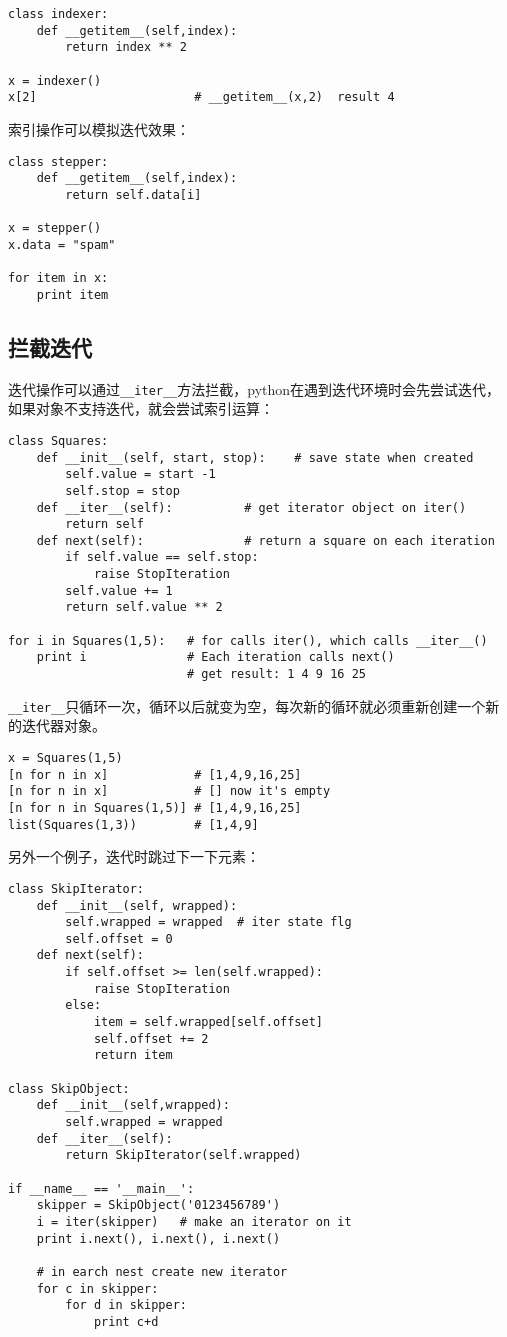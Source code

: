 \begin{lstlisting}
class indexer:
	def __getitem__(self,index):
		return index ** 2

x = indexer()
x[2]                      # __getitem__(x,2)  result 4
\end{lstlisting}

索引操作可以模拟迭代效果：

\begin{lstlisting}
class stepper:
	def __getitem__(self,index):
		return self.data[i]

x = stepper()
x.data = "spam"

for item in x:
	print item
\end{lstlisting}

\subsection{拦截迭代}

迭代操作可以通过\verb|__iter__|方法拦截，python在遇到迭代环境时会先尝试迭代，如果对象不支持迭代，就会尝试索引运算：

\begin{lstlisting}
class Squares:
	def __init__(self, start, stop):    # save state when created
		self.value = start -1
		self.stop = stop
	def __iter__(self):          # get iterator object on iter()
		return self
	def next(self):              # return a square on each iteration
		if self.value == self.stop:
			raise StopIteration
		self.value += 1
		return self.value ** 2

for i in Squares(1,5):   # for calls iter(), which calls __iter__()
	print i              # Each iteration calls next()
	                     # get result: 1 4 9 16 25
\end{lstlisting}

\verb|__iter__|只循环一次，循环以后就变为空，每次新的循环就必须重新创建一个新的迭代器对象。

\begin{lstlisting}
x = Squares(1,5)
[n for n in x]            # [1,4,9,16,25]
[n for n in x]            # [] now it's empty
[n for n in Squares(1,5)] # [1,4,9,16,25]
list(Squares(1,3))        # [1,4,9]
\end{lstlisting}

另外一个例子，迭代时跳过下一下元素：

\begin{lstlisting}
class SkipIterator:
	def __init__(self, wrapped):
		self.wrapped = wrapped  # iter state flg
		self.offset = 0
	def next(self):
		if self.offset >= len(self.wrapped):
			raise StopIteration
		else:
			item = self.wrapped[self.offset]
			self.offset += 2
			return item

class SkipObject:
	def __init__(self,wrapped):
		self.wrapped = wrapped
	def __iter__(self):
		return SkipIterator(self.wrapped)

if __name__ == '__main__':
	skipper = SkipObject('0123456789')
	i = iter(skipper)   # make an iterator on it
	print i.next(), i.next(), i.next()
	
	# in earch nest create new iterator
	for c in skipper:
		for d in skipper:
			print c+d
\end{lstlisting}

